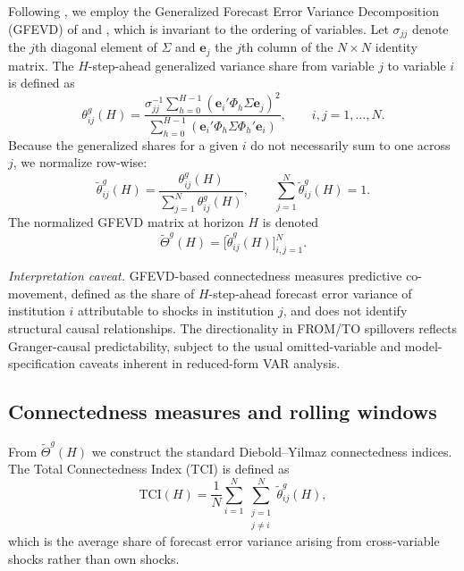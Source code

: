 Following \citet{DieboldYilmaz2012}, we employ the Generalized Forecast Error Variance
Decomposition (GFEVD) of \citet{KoopPesaranShin1996} and \citet{PesaranShin1998}, which
is invariant to the ordering of variables. Let $\sigma_{jj}$ denote the $j$th diagonal
element of $\Sigma$ and $\mathbf{e}_j$ the $j$th column of the $N \times N$ identity
matrix. The $H$-step-ahead generalized variance share from variable $j$ to variable $i$
is defined as
\begin{equation}
  \theta_{ij}^{g}(H)
  = \frac{
      \sigma_{jj}^{-1}
      \sum_{h=0}^{H-1}
      \left( \mathbf{e}_i' \Phi_h \Sigma \mathbf{e}_j \right)^2
    }{
      \sum_{h=0}^{H-1}
      \left( \mathbf{e}_i' \Phi_h \Sigma \Phi_h' \mathbf{e}_i \right)
    },
  \qquad i,j = 1,\dots,N.
\end{equation}
Because the generalized shares for a given $i$ do not necessarily sum to one across $j$,
we normalize row-wise:
\begin{equation}
  \tilde{\theta}_{ij}^{g}(H)
  = \frac{\theta_{ij}^{g}(H)}
         {\sum_{j=1}^N \theta_{ij}^{g}(H)},
  \qquad \sum_{j=1}^N \tilde{\theta}_{ij}^{g}(H) = 1.
\end{equation}
The normalized GFEVD matrix at horizon $H$ is denoted
\[
  \tilde{\Theta}^g(H)
  = \big[ \tilde{\theta}_{ij}^{g}(H) \big]_{i,j=1}^N.
\]

\noindent\textit{Interpretation caveat.} GFEVD-based connectedness measures predictive
co-movement, defined as the share of $H$-step-ahead forecast error variance of institution $i$
attributable to shocks in institution $j$, and does not identify structural causal
relationships. The directionality in FROM/TO spillovers reflects Granger-causal
predictability, subject to the usual omitted-variable and model-specification caveats
inherent in reduced-form VAR analysis.

\subsection{Connectedness measures and rolling windows}\label{subsec:rolling}

From $\tilde{\Theta}^g(H)$ we construct the standard Diebold--Yilmaz connectedness
indices. The Total Connectedness Index (TCI) is defined as
\begin{equation}
  \mathrm{TCI}(H)
  = \frac{1}{N}
    \sum_{i=1}^N \sum_{\substack{j=1 \\ j \neq i}}^N
    \tilde{\theta}_{ij}^g(H),
\end{equation}
which is the average share of forecast error variance arising from cross-variable shocks
rather than own shocks.

